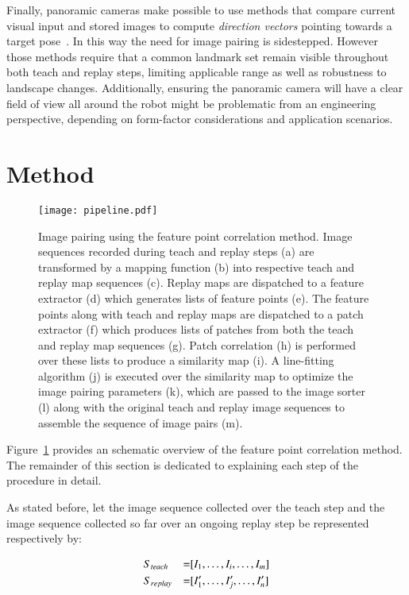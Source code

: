 \documentclass[twocolumn, 9pt,fleqn]{jsproceedings}
\begin{document}
Finally, panoramic cameras make possible to use methods that compare current visual input and stored images to compute \textit{direction vectors} pointing towards a target pose~\cite{LAM00,VAR05}. In this way the need for image pairing is sidestepped. However those methods require that a common landmark set remain visible throughout both teach and replay steps, limiting applicable range as well as robustness to landscape changes. Additionally, ensuring the panoramic camera will have a clear field of view all around the robot might be problematic from an engineering perspective, depending on form-factor considerations and application scenarios.

\section{Method}

\begin{figure}[t]
\texttt{[image: pipeline.pdf]}
\caption{Image pairing using the feature point correlation method. Image sequences recorded during teach and replay steps (a) are transformed by a mapping function (b) into respective teach and replay map sequences (c). Replay maps are dispatched to a feature extractor (d) which generates lists of feature points (e). The feature points along with teach and replay maps are dispatched to a patch extractor (f) which produces lists of patches from both the teach and replay map sequences (g). Patch correlation (h) is performed over these lists to produce a similarity map (i). A line-fitting algorithm (j) is executed over the similarity map to optimize the image pairing parameters (k), which are passed to the image sorter (l) along with the original teach and replay image sequences to assemble the sequence of image pairs (m).}
\label{fig:pipeline}
\end{figure}

Figure~\ref{fig:pipeline} provides an schematic overview of the feature point correlation method. The remainder of this section is dedicated to explaining each step of the procedure in detail.

As stated before, let the image sequence collected over the teach step and the image sequence collected so far over an ongoing replay step be represented respectively by:

\begin{alignat}{3}
& S_{teach} & = & [I_1, \dotsc, I_i, \dotsc, I_m] \notag \\
& S_{replay} & = & [I'_1, \dotsc, I'_j, \dotsc, I'_n] \notag
\end{alignat}
\end{document}
